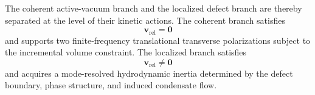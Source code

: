 The coherent active-vacuum branch and the localized defect branch are thereby separated at the level of their kinetic actions. The coherent branch satisfies
\begin{equation}
    \mathbf{v}_{\mathrm{rel}} = \mathbf{0}
\end{equation}
and supports two finite-frequency translational transverse polarizations subject to the incremental volume constraint. The localized branch satisfies
\begin{equation}
    \mathbf{v}_{\mathrm{rel}} \neq \mathbf{0}
\end{equation}
and acquires a mode-resolved hydrodynamic inertia determined by the defect boundary, phase structure, and induced condensate flow.